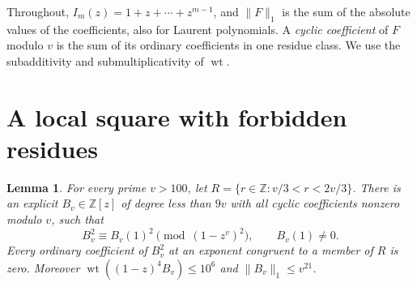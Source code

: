 \documentclass[10pt,a4paper,reqno]{amsart}
\newtheorem{lemma}[theorem]{Lemma}
\newcommand{\wt}{\operatorname{wt}}
\newcommand{\ZZ}{\mathbb Z}
\begin{document}
Throughout, $I_m(z)=1+z+\cdots+z^{m-1}$, and $\|F\|_1$ is the sum of the absolute values of the coefficients, also for Laurent polynomials. A \emph{cyclic coefficient} of $F$ modulo $v$ is the sum of its ordinary coefficients in one residue class. We use the subadditivity and submultiplicativity of $\wt$.

\section{A local square with forbidden residues}\label{sec:local}
\begin{lemma}\label{local}
For every prime $v>100$, let $R=\{r\in\ZZ:v/3<r<2v/3\}$. There is an explicit $B_v\in\ZZ[z]$ of degree less than $9v$ with all cyclic coefficients nonzero modulo $v$, such that
\[
 B_v^2\equiv B_v(1)^2\pmod{(1-z^v)^2},\qquad B_v(1)\ne0 .
\]
Every ordinary coefficient of $B_v^2$ at an exponent congruent to a member of $R$ is zero. Moreover $\wt((1-z)^4B_v)\le10^6$ and $\|B_v\|_1\le v^{21}$.
\end{lemma}
\end{document}
